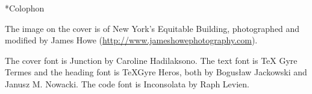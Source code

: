 \begin{chapter}*{Colophon}

The image on the cover is of New York's Equitable Building, photographed and 
modified by James Howe (\url{http://www.jameshowephotography.com}).
\medskip

\noindent The cover font is Junction by Caroline Hadilaksono.  The text font is \TeX
Gyre Termes and the heading font is \TeX Gyre Heros, both by Bogus\l{}aw
Jackowski and Janusz M. Nowacki.  The code font is Inconsolata by Raph Levien.

\end{chapter}

\pagebreak
\thispagestyle{empty}
\mbox{}


